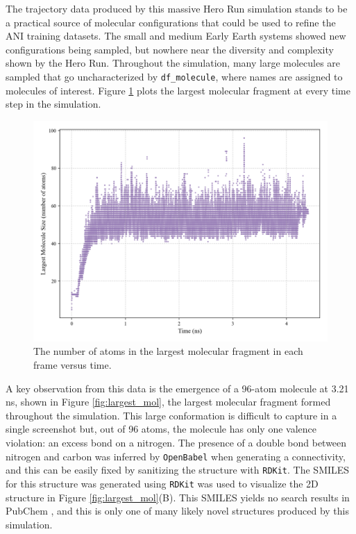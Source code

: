 The trajectory data produced by this massive Hero Run simulation stands to be a practical source of molecular configurations that could be used to refine the ANI training datasets.
The small and medium Early Earth systems showed new configurations being sampled, but nowhere near the diversity and complexity shown by the Hero Run.
Throughout the simulation, many large molecules are sampled that go uncharacterized by \verb|df_molecule|, where names are assigned to molecules of interest. 
Figure \ref{fig:largest_mol_vs_time} plots the largest molecular fragment at every time step in the simulation.

\begin{figure}[!ht]
    \centering
    \includegraphics[width=1\linewidth]{Images/early_earth/updated_largest_mol_vs_time.png}
    \caption[Largest molecule per frame throughout the Hero Run simulation]{The number of atoms in the largest molecular fragment in each frame versus time.}
    \label{fig:largest_mol_vs_time}
\end{figure}

A key observation from this data is the emergence of a 96-atom molecule at 3.21 ns, shown in Figure \ref{fig:largest_mol}, the largest molecular fragment formed throughout the simulation.
This large conformation is difficult to capture in a single screenshot but, out of 96 atoms, the molecule has only one valence violation: an excess bond on a nitrogen.
The presence of a double bond between nitrogen and carbon was inferred by \verb|OpenBabel| \cite{babel} when generating a connectivity, and this can be easily fixed by sanitizing the structure with \verb|RDKit|.
The SMILES for this structure was generated using \verb|RDKit| was used to visualize the 2D structure in Figure \ref{fig:largest_mol}(B).
This SMILES yields no search results in PubChem \cite{pubchem}, and this is only one of many likely novel structures produced by this simulation.

